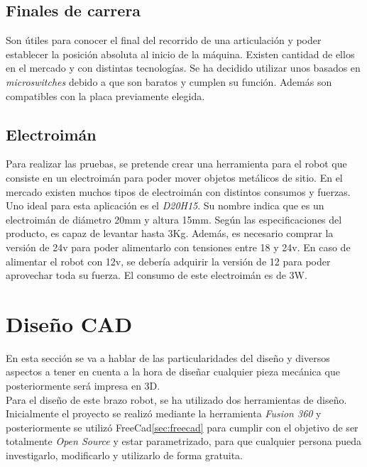 \subsection{Finales de carrera}
Son útiles para conocer el final del recorrido de una articulación y poder establecer la posición absoluta al inicio de la 
máquina. 
Existen cantidad de ellos en el mercado y con distintas tecnologías. Se ha decidido utilizar unos basados en \textit{microswitches} debido a 
que son baratos y cumplen su función. Además son compatibles con la placa previamente elegida. 
\subsection{Electroimán}
Para realizar las pruebas, se pretende crear una herramienta para el robot que consiste en un electroimán para poder mover objetos metálicos 
de sitio. En el mercado existen muchos tipos de electroimán con distintos consumos y fuerzas. Uno ideal para esta aplicación es el \textit{D20H15}.
Su nombre indica que es un electroimán de diámetro 20mm y altura 15mm. Según las especificaciones del producto, es capaz de levantar hasta 3Kg. 
Además, es necesario comprar la versión de 24v para poder alimentarlo con tensiones entre 18 y 24v. En caso de alimentar el robot con 12v, se debería 
adquirir la versión de 12 para poder aprovechar toda su fuerza. El consumo de este electroimán es de 3W.
\newpage
\section{Diseño CAD}
En esta sección se va a hablar de las particularidades del diseño y diversos aspectos a tener en cuenta a la hora de diseñar 
cualquier pieza mecánica que posteriormente será impresa en 3D. 
\\
Para el diseño de este brazo robot, se ha utilizado dos herramientas de diseño. Inicialmente el proyecto se realizó mediante 
la herramienta \textit{Fusion 360} y posteriormente se utilizó FreeCad\ref{sec:freecad} para cumplir con el objetivo de ser totalmente 
\textit{Open Source} y estar parametrizado, para que cualquier persona pueda investigarlo, modificarlo y utilizarlo de forma gratuita.
\\ 

